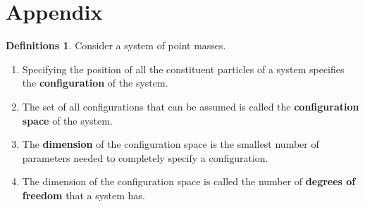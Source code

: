\documentclass[10pt, psamsfonts]{amsart}
\theoremstyle{definition}
\newtheorem{defns}[thm]{Definitions}
\theoremstyle{remark}
\numberwithin{equation}{section}
\begin{document}
\section{Appendix}
\appendix
\begin{defns}
    \label{def: Configuration Space}
  Consider a system of point masses. 
  \begin{enumerate}
    \item Specifying the position of all the constituent particles of a system specifies the \textbf{configuration} of the system.
    \item The set of all configurations that can be assumed is called the \textbf{configuration space} of the system.
    \item The \textbf{dimension} of the configuration space is the smallest number of parameters needed to completely specify a configuration.
    \item The dimension of the configuration space is called the number of \textbf{degrees of freedom} that a system has.
  \end{enumerate}
\end{defns}
\end{document}

